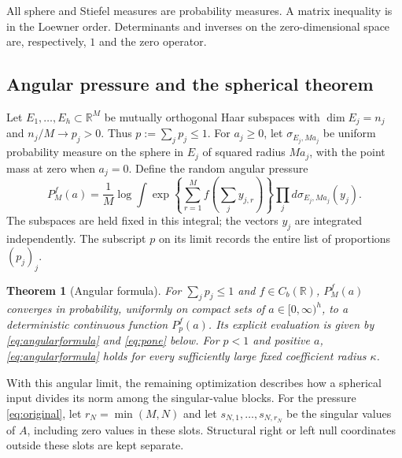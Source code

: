 \documentclass[11pt]{article}
\numberwithin{equation}{section}
\newtheorem{theorem}{Theorem}[section]
\theoremstyle{definition}
\newcommand{\R}{\mathbb R}
\begin{document}
All sphere and Stiefel measures are probability measures. A matrix inequality is in the Loewner order. Determinants and inverses on the zero-dimensional space are, respectively, $1$ and the zero operator.

\subsection{Angular pressure and the spherical theorem}
Let $E_1,\ldots,E_h\subset\R^M$ be mutually orthogonal Haar subspaces with $\dim E_j=n_j$ and $n_j/M\to p_j>0$. Thus $p:=\sum_jp_j\le1$. For $a_j\ge0$, let $\sigma_{E_j,Ma_j}$ be uniform probability measure on the sphere in $E_j$ of squared radius $Ma_j$, with the point mass at zero when $a_j=0$. Define the random angular pressure
\begin{equation}\label{eq:angularpressure}
P_M^f(a)=\frac1M\log\int\exp\left\{\sum_{r=1}^M f\left(\sum_jy_{j,r}\right)\right\}
\prod_jd\sigma_{E_j,Ma_j}(y_j).
\end{equation}
The subspaces are held fixed in this integral; the vectors $y_j$ are integrated independently. The subscript $p$ on its limit records the entire list of proportions $(p_j)_j$.

\begin{theorem}[Angular formula]\label{thm:angular}
For $\sum_jp_j\le1$ and $f\in C_b(\R)$, $P_M^f(a)$ converges in probability, uniformly on compact sets of $a\in[0,\infty)^h$, to a deterministic continuous function $P_p^f(a)$. Its explicit evaluation is given by \eqref{eq:angularformula} and \eqref{eq:pone} below. For $p<1$ and positive $a$, \eqref{eq:angularformula} holds for every sufficiently large fixed coefficient radius $\kappa$.
\end{theorem}

With this angular limit, the remaining optimization describes how a spherical input divides its norm among the singular-value blocks. For the pressure \eqref{eq:original}, let $r_N=\min(M,N)$ and let $s_{N,1},\ldots,s_{N,r_N}$ be the singular values of $A$, including zero values in these slots. Structural right or left null coordinates outside these slots are kept separate.
\end{document}
